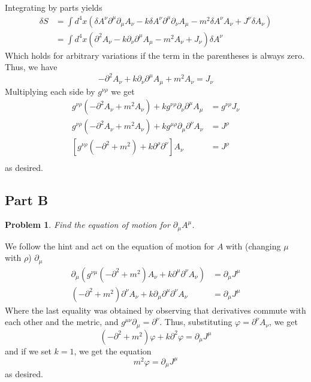 \documentclass[fontsize=11pt]{scrartcl} %
\numberwithin{equation}{section} %
\numberwithin{figure}{section} %
\numberwithin{table}{section} %
\newtheorem*{problem}{Problem}
\begin{document}
Integrating by parts yields
\[
    \begin{aligned}
        \delta S
        &=\int d^4x
        (
            \delta A^{\nu}\partial^{\mu}\partial_{\mu}A_{\nu}
            -k\delta A^{\nu}\partial^{\mu}\partial_{\nu}A_{\mu}
            -m^2\delta A^{\nu}A_{\nu} + J^{\nu}\delta A_{\nu}
        )\\
        &=\int d^4x
        (
            \partial^2A_{\nu} - k\partial_{\nu}\partial^{\mu}A_{\mu} -
            m^2A_{\nu} + J_{\nu}
        )\delta A^{\nu}
    \end{aligned}
\]
Which holds for arbitrary variations if the term in the parentheses is always
zero. Thus, we have
\[
    -\partial^2 A_{\nu} + k\partial_{\nu}\partial^{\mu}A_{\mu} + m^2A_{\nu} =
    J_{\nu}
\]
Multiplying each side by $g^{\nu\rho}$ we get
\[
    \begin{aligned}
        g^{\nu\rho}(-\partial^2 A_{\nu} + m^2A_{\nu}) + 
        kg^{\nu\rho}\partial_{\nu}\partial^{\mu}A_{\mu} &= g^{\nu\rho}J_{\nu}\\
        g^{\nu\rho}(-\partial^2 A_{\nu} + m^2A_{\nu}) + 
        kg^{\mu\rho}\partial_{\mu}\partial^{\nu}A_{\nu} &= J^{\rho}\\
        \left[ g^{\nu\rho}(-\partial^2  + m^2) + 
        k\partial^{\rho}\partial^{\nu}\right]A_{\nu} &= J^{\rho}\\
    \end{aligned}
\]
 as desired.
\newpage
 \subsection*{Part B}
 \begin{problem}
     Find the equation of motion for $\partial_{\mu}A^{\mu}$.
 \end{problem}

We follow the hint and act on the equation of motion for $A$ with (changing
$\mu$ with $\rho$)
$\partial_{\mu}$
\[
    \begin{aligned}
        \partial_{\mu}\left( g^{\nu\mu}(-\partial^2  + m^2)A_{\nu} + 
        k\partial^{\mu}\partial^{\nu}A_{\nu}\right) &= \partial_{\mu}J^{\mu}\\
        (-\partial^2 + m^2)\partial^{\nu}A_{\nu} +
        k\partial_{\mu}\partial^{\mu}\partial^{\nu}A_{\nu} &=
        \partial_{\mu}J^{\mu}
    \end{aligned}
\]
Where the last equality was obtained by observing that derivatives commute with
each other and the metric, and $g^{\mu\nu}\partial_{\mu} = \partial^{\nu}$.
Thus, substituting $\varphi = \partial^{\nu}A_{\nu}$, we get
\[
    (-\partial^2 + m^2)\varphi + k\partial^2\varphi = \partial_{\mu}J^{\mu}
\]
and if we set $k=1$, we get the equation
\[
    m^2\varphi = \partial_{\mu}J^{\mu}
\]
as desired.
\end{document}
